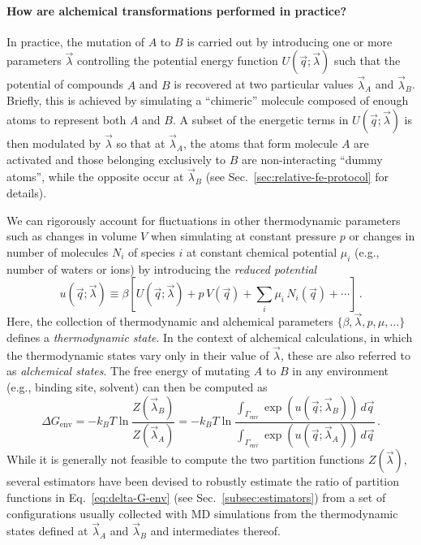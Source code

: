 \documentclass[9pt,bestpractices]{livecoms}
\begin{document}
\paragraph{How are alchemical transformations performed in practice?}

In practice, the mutation of $A$ to $B$ is carried out by introducing one or more parameters $\vec{\lambda}$ controlling the potential energy function $U(\vec{q};\vec{\lambda})$ such that the potential of compounds $A$ and $B$ is recovered at two particular values $\vec{\lambda}_A$ and $\vec{\lambda}_B$.
Briefly, this is achieved by simulating a ``chimeric'' molecule composed of enough atoms to represent both $A$ and $B$.
A subset of the energetic terms in $U(\vec{q};\vec{\lambda})$ is then modulated by $\vec{\lambda}$ so that at $\vec{\lambda}_A$, the atoms that form molecule $A$ are activated and those belonging exclusively to $B$ are non-interacting ``dummy atoms'', while the opposite occur at $\vec{\lambda}_B$ (see Sec.~\ref{sec:relative-fe-protocol} for details).

We can rigorously account for fluctuations in other thermodynamic parameters such as changes in volume $V$ when simulating at constant pressure $p$ or changes in number of molecules $N_i$ of species $i$ at constant chemical potential $\mu_i$ (e.g., number of waters or ions) by introducing the \textit{reduced potential}~\cite{shirts2008statisticallya}
\begin{equation}\label{eq:reduced-potential}
u(\vec{q};\vec{\lambda}) \equiv \beta \left[ U(\vec{q};\vec{\lambda}) + p \, V(\vec{q}) + \sum_i \mu_i \, N_i(\vec{q}) + \cdots \right] \, .
\end{equation}
Here, the collection of thermodynamic and alchemical parameters $\{\beta, \vec{\lambda}, p, \mu, \ldots\}$ defines a \emph{thermodynamic state}.
In the context of alchemical calculations, in which the thermodynamic states vary only in their value of $\vec{\lambda}$, these are also referred to as \emph{alchemical states}.
The free energy of mutating $A$ to $B$ in any environment (e.g., binding site, solvent) can then be computed as
\begin{equation}\label{eq:delta-G-env}
    \Delta G_{\mathrm{env}} = - k_BT \ln \frac{Z(\vec{\lambda}_B)}{Z(\vec{\lambda}_A)} = - k_BT \ln \frac{\int_{\Gamma_{\mathrm{env}}} \exp\left( u(\vec{q}; \vec{\lambda}_B) \right) \, d\vec{q}}{\int_{\Gamma_{\mathrm{env}}} \exp\left( u(\vec{q}; \vec{\lambda}_A) \right) \, d\vec{q}} \, .
\end{equation}
While it is generally not feasible to compute the two partition functions $Z(\vec{\lambda})$, several estimators have been devised to robustly estimate the ratio of partition functions in Eq.~\ref{eq:delta-G-env} (see Sec.~\ref{subsec:estimators}) from a set of configurations usually collected with MD simulations from the thermodynamic states defined at $\vec{\lambda}_A$ and $\vec{\lambda}_B$ and intermediates thereof.
\end{document}
